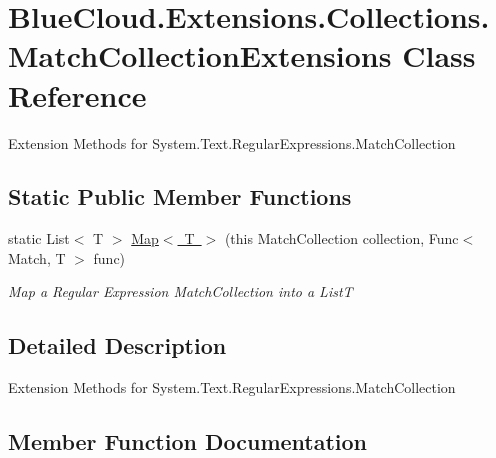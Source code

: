 \hypertarget{class_blue_cloud_1_1_extensions_1_1_collections_1_1_match_collection_extensions}{}\section{Blue\+Cloud.\+Extensions.\+Collections.\+Match\+Collection\+Extensions Class Reference}
\label{class_blue_cloud_1_1_extensions_1_1_collections_1_1_match_collection_extensions}


Extension Methods for System.\+Text.\+Regular\+Expressions.\+Match\+Collection  


\subsection*{Static Public Member Functions}
\begin{DoxyCompactItemize}
\item 
static List$<$ T $>$ \mbox{\hyperlink{class_blue_cloud_1_1_extensions_1_1_collections_1_1_match_collection_extensions_abd553952cfaab67656fcdc6745da00ea}{Map$<$ T $>$}} (this Match\+Collection collection, Func$<$ Match, T $>$ func)
\begin{DoxyCompactList}\small\item\em Map a Regular Expression Match\+Collection into a List{\itshape T}  \end{DoxyCompactList}\end{DoxyCompactItemize}


\subsection{Detailed Description}
Extension Methods for System.\+Text.\+Regular\+Expressions.\+Match\+Collection 



\subsection{Member Function Documentation}
\mbox{\label{class_blue_cloud_1_1_extensions_1_1_collections_1_1_match_collection_extensions_abd553952cfaab67656fcdc6745da00ea}} 
